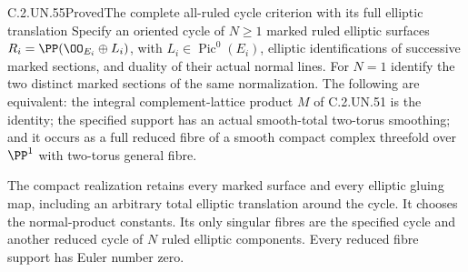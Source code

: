 \begin{statement}{C.2.UN.55}{Proved}{The complete all-ruled cycle criterion with its full elliptic translation}
Specify an oriented cycle of $N\geq1$ marked ruled elliptic surfaces
$R_i=\PP(\OO_{E_i}\oplus L_i)$, with
$L_i\in\operatorname{Pic}^0(E_i)$, elliptic identifications of
successive marked sections, and duality of their actual normal
lines. For $N=1$ identify the two distinct marked sections of
the same normalization. The following are equivalent:
the integral complement-lattice product $M$ of C.2.UN.51 is the
identity; the specified support has an actual smooth-total
two-torus smoothing; and it occurs as a full reduced fibre of
a smooth compact complex threefold over $\PP^1$ with two-torus
general fibre.

The compact realization retains every marked surface and every
elliptic gluing map, including an arbitrary total elliptic
translation around the cycle. It chooses the normal-product
constants. Its only singular fibres are the specified cycle and
another reduced cycle of $N$ ruled elliptic components. Every
reduced fibre support has Euler number zero.
\end{statement}

